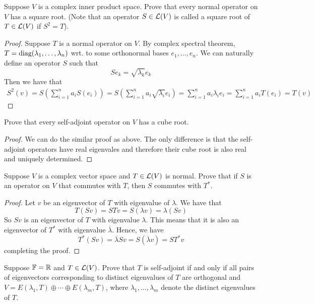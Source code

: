 \documentclass{extarticle}
\begin{document}
\begin{problem}{10}
    Suppose \(V\) is a complex inner product space. Prove that every normal operator on \(V\) 
    has a square root. (Note that an operator \(S \in \mathcal{L}(V)\) is called a square root of \(T 
    \in \mathcal{L}(V)\) if \(S^2 = T\)).
\end{problem}

\begin{proof}
Suppose \(T\) is a normal operator on \(V\). By complex spectral theorem, \(T = \text{diag}(\lambda_1, 
\ldots, \lambda_n)\) wrt. to some orthonormal bases \(e_1, \ldots, e_n\). We can naturally define 
an operator \(S\) such that 
\[Se_k = \sqrt{\lambda_k} e_k\]
Then we have that 
\begin{align*}
    S^2(v) = S\left(\sum_{i=1}^{n} a_i S(e_i)\right) = S\left(\sum_{i=1}^{n} a_i \sqrt{\lambda_i} e_i \right) 
    = \sum_{i=1}^{n} a_i \lambda_i e_i = \sum_{i=1}^{n} a_i T(e_i) = T(v)
\end{align*}
\end{proof}

\begin{problem}{11}
    Prove that every self-adjoint operator on \(V\) has a cube root. 
\end{problem}

\begin{proof}
We can do the similar proof as above. The only difference is that the self-adjoint operators have 
real eigenvales and therefore their cube root is also real and uniquely determined. 
\end{proof}

\begin{problem}{12}
    Suppose \(V\) is a complex vector space and \(T \in \mathcal{L}(V)\) is normal. Prove that if \(S\)
    is an operator on \(V\) that commutes with \(T\), then \(S\) commutes with \(T^*\).
\end{problem}

\begin{proof}
Let \(v\) be an eigenvector of \(T\) with eigenvalue of \(\lambda\). We have that 
\[T(Sv) = STv = S (\lambda v) = \lambda(Sv)\]
So \(Sv\) is an eigenvector of \(T\) with eigenvalue \(\lambda\). This means that it is also an eigenvector 
of \(T^*\) with eigenvalue \(\overline{\lambda}\). Hence, we have 
\[T^*(Sv) = \overline{\lambda}Sv = S(\overline{\lambda} v) = S T^*v\]
completing the proof. 
\end{proof}

\begin{problem}{14}
    Suppose \(\mathbb{F} = \mathbb{R}\) and \(T \in \mathcal{L}(V)\). Prove that \(T\) is self-adjoint if and only if 
    all pairs of eigenvectors corresponding to distinct eigenvalues of \(T\) are orthogonal and 
    \(V = E(\lambda_1, T) \oplus \cdots \oplus E(\lambda_m, T)\), where \(\lambda_1, \ldots, \lambda_m\)
    denote the distinct eigenvalues of \(T\).
\end{problem}
\end{document}

